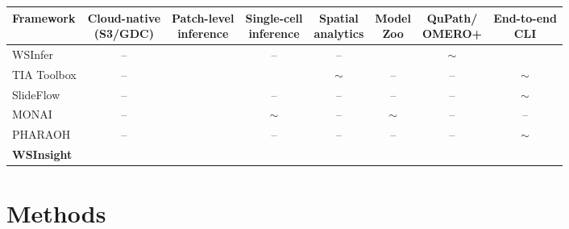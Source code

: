 \documentclass[sn-mathphys-num]{sn-jnl}%
\theoremstyle{thmstyleone}%
\theoremstyle{thmstyletwo}%
\theoremstyle{thmstylethree}%
\begin{document}
	\begin{table}[tb!]%
		\centering%
		\scriptsize%
		\label{tab:feature_comparison}%
		\begin{tabular}{l c c c c c c c}%
			\toprule%
			\textbf{Framework} & \makecell{\textbf{Cloud-native}\\\textbf{(S3/GDC)}} & \makecell{\textbf{Patch-level}\\\textbf{inference}} & \makecell{\textbf{Single-cell}\\\textbf{inference}} & \makecell{\textbf{Spatial}\\\textbf{analytics}} & \makecell{\textbf{Model}\\\textbf{Zoo}} & \makecell{\textbf{QuPath/}\\\textbf{OMERO+}} & \makecell{\textbf{End-to-end}\\\textbf{CLI}} \\
			\midrule%
			WSInfer \cite{Kaczmarzyk:2024}  & --          & \checkmark & --          & --          & \checkmark & $\sim$     & \checkmark \\
			TIA Toolbox \cite{Pocock:2022}  & --          & \checkmark & \checkmark  & $\sim$      & --         & --         & $\sim$     \\
			SlideFlow \cite{Dolezal:2024}   & --          & \checkmark & --          & --          & --         & --         & $\sim$     \\
			MONAI \cite{Cardoso:2022}       & --          & \checkmark & $\sim$      & --          & $\sim$     & --         & --         \\
			PHARAOH \cite{Faust:2024}       & --          & \checkmark & --          & --          & --         & --         & $\sim$     \\
			\textbf{WSInsight}              & \checkmark  & \checkmark & \checkmark  & \checkmark  & \checkmark & \checkmark & \checkmark \\
			\bottomrule%
		\end{tabular}%
	\end{table}%
	
	
	\section{Methods}
	\label{sec:methods}
	
\end{document}
